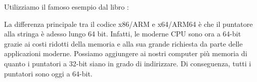 \chapterold{\HelloWorldSectionName}
\label{sec:helloworld}

Utilizziamo il famoso esempio dal libro \KRBook:














\sectionold{\Conclusion{}}

La differenza principale tra il codice x86/ARM e x64/ARM64 è che il puntatore alla stringa è adesso lungo 64 bit.
Infatti, le moderne \ac{CPU} sono ora a 64-bit grazie ai costi ridotti della memoria e alla sua grande richiesta da parte delle applicazioni moderne. 
Possiamo aggiungere ai nostri computer più memoria di quanto i puntatori a 32-bit siano in grado di indirizzare.  
Di conseguenza, tutti i puntatori sono oggi a 64-bit.


